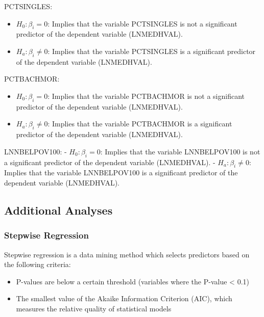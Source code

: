 \documentclass[
]{article}
\providecommand{\tightlist}{%
  \setlength{\itemsep}{0pt}\setlength{\parskip}{0pt}}
\begin{document}
PCTSINGLES:

\begin{itemize}
\tightlist
\item
  \(H_0: β_i=0\): Implies that the variable PCTSINGLES is not a
  significant predictor of the dependent variable (LNMEDHVAL).
\item
  \(H_a: β_i≠0\): Implies that the variable PCTSINGLES is a significant
  predictor of the dependent variable (LNMEDHVAL).
\end{itemize}

PCTBACHMOR:

\begin{itemize}
\tightlist
\item
  \(H_0: β_i=0\): Implies that the variable PCTBACHMOR is not a
  significant predictor of the dependent variable (LNMEDHVAL).
\item
  \(H_a: β_i≠0\): Implies that the variable PCTBACHMOR is a significant
  predictor of the dependent variable (LNMEDHVAL).
\end{itemize}

LNNBELPOV100: - \(H_0: β_i=0\): Implies that the variable LNNBELPOV100
is not a significant predictor of the dependent variable (LNMEDHVAL). -
\(H_a: β_i≠0\): Implies that the variable LNNBELPOV100 is a significant
predictor of the dependent variable (LNMEDHVAL).

\hypertarget{additional-analyses}{%
\subsection{Additional Analyses}\label{additional-analyses}}

\hypertarget{stepwise-regression}{%
\subsubsection{Stepwise Regression}\label{stepwise-regression}}

Stepwise regression is a data mining method which selects predictors
based on the following criteria:

\begin{itemize}
\tightlist
\item
  P-values are below a certain threshold (variables where the P-value
  \textless{} 0.1)
\item
  The smallest value of the Akaike Information Criterion (AIC), which
  measures the relative quality of statistical models
\end{itemize}
\end{document}
